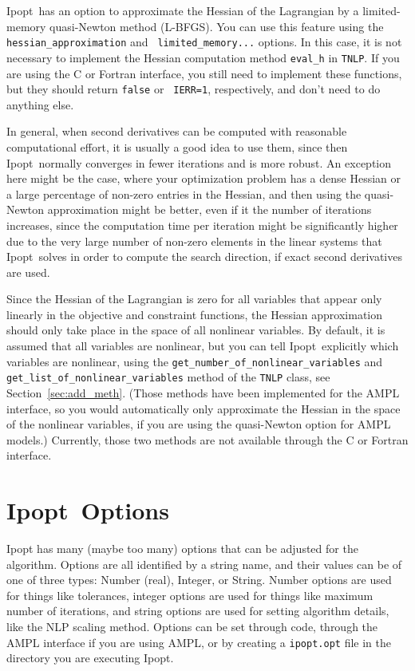 \documentclass[10pt]{article}
\newcommand{\Ipopt}{{\sc Ipopt}}
\begin{document}
\Ipopt\ has an option to approximate the Hessian of the Lagrangian by
a limited-memory quasi-Newton method (L-BFGS).  You can use this
feature using the {\tt hessian\_approximation} and {\tt
  limited\_memory...} options.  In this case, it is not necessary to
implement the Hessian computation method {\tt eval\_h} in {\tt TNLP}.
If you are using the C or Fortran interface, you still need to
implement these functions, but they should return {\tt false} or {\tt
  IERR=1}, respectively, and don't need to do anything else.

In general, when second derivatives can be computed with reasonable
computational effort, it is usually a good idea to use them, since
then \Ipopt\ normally converges in fewer iterations and is more
robust.  An exception here might be the case, where your optimization
problem has a dense Hessian or a large percentage of non-zero entries
in the Hessian, and then using the quasi-Newton approximation might be
better, even if it the number of iterations increases, since the
computation time per iteration might be significantly higher due to
the very large number of non-zero elements in the linear systems that
\Ipopt\ solves in order to compute the search direction, if exact
second derivatives are used.

Since the Hessian of the Lagrangian is zero for all variables that
appear only linearly in the objective and constraint functions, the
Hessian approximation should only take place in the space of all
nonlinear variables.  By default, it is assumed that all variables are
nonlinear, but you can tell \Ipopt\ explicitly which variables are
nonlinear, using the {\tt get\_number\_of\_nonlinear\_variables} and
{\tt get\_list\_of\_nonlinear\_variables} method of the {\tt TNLP}
class, see Section~\ref{sec:add_meth}.  (Those methods have been
implemented for the AMPL interface, so you would automatically only
approximate the Hessian in the space of the nonlinear variables, if
you are using the quasi-Newton option for AMPL models.)  Currently,
those two methods are not available through the C or Fortran
interface.

\section{\Ipopt\ Options}\label{sec:options}
Ipopt has many (maybe too many) options that can be adjusted for the
algorithm.  Options are all identified by a string name, and their
values can be of one of three types: Number (real), Integer, or
String. Number options are used for things like tolerances, integer
options are used for things like maximum number of iterations, and
string options are used for setting algorithm details, like the NLP
scaling method. Options can be set through code, through the AMPL
interface if you are using AMPL, or by creating a {\tt ipopt.opt}
file in the directory you are executing \Ipopt.
\end{document}
